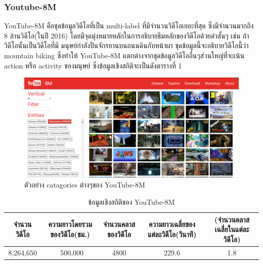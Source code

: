 \subsubsection*{Youtube-8M}
YouTube-8M คือชุดข้อมูลวิดีโอที่เป็น multi-label ที่มีจำนวนวิดีโอเยอะที่สุด ซึ่งมีจำนวนมากถึง 8 ล้านวิดีโอ(ในปี 2016) โดยมีจุดมุ่งหมายหลักในการอธิบายธีมหลักของวิดีโอด้วยคำสั้นๆ เช่น ถ้าวิดีโอนั้นเป็นวิดีโอที่มี มนุษย์กำลังปั่นจักรยานบนถนนดินกับหน้าผา ชุดข้อมูลนี้จะอธิบายวิดีโอนี้ว่า mountain biking ซึ่งทำให้ YouTube-8M แตกต่างจากชุดข้อมูลวิดีโออื่นๆส่วนใหญ่ที่จะเน้น action หรือ activity ของมนุษย์ ซึ่งข้อมูลเชิงสถิติจะเป็นดังตารางที่ 1

\begin{figure}[!ht]
	\centering
	\includegraphics[width=1\textwidth]{chapter2/images/youtube-8m.png}
		\caption{ตัวอย่าง catagories ต่างๆของ YouTube-8M}
    	\label{fig:youtube-8m}
\end{figure}

\begin{table}[!ht]
\begin{tabular}{|c|c|c|c|c|}
		\hline
		{จำนวนวิดีโอ}&{ความยาวโดยรวมของวิดีโอ(ชม.)}&{จำนวนคลาสของวิดีโอ}&{ความยาวเฉลี่ยของแต่ละวิดีโอ(วินาที)}&{(จำนวนคลาสเฉลี่ยในแต่ละวิดีโอ)}\\
		\hline
		8,264,650			& ~500,000		& 4800		& 229.6		& 1.8											\\
		\hline
	\end{tabular}
	\caption{ข้อมูลเชิงสถิติของ YouTube-8M}
	\label{tab: ข้อมูลเชิงสถิติของ YouTube-8M}
\end{table}

